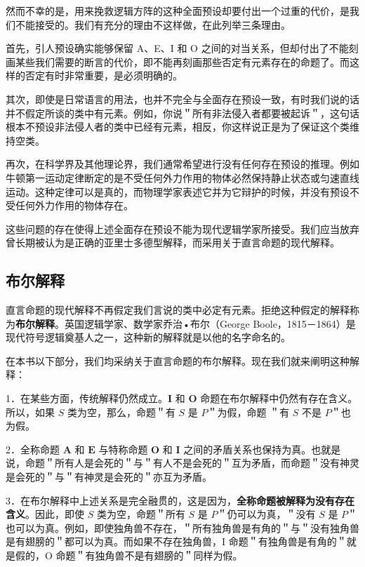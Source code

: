 \begin{logicbox}[title=章节导读]
然而不幸的是，用来挽救逻辑方阵的这种全面预设却要付出一个过重的代价，是我们不能接受的。我们有充分的理由不这样做，在此列举三条理由。

首先，引人预设确实能够保留 A、E、I 和 O 之间的对当关系，但却付出了不能刻画某些我们需要的断言的代价，即不能再刻画那些否定有元素存在的命题了。而这样的否定有时非常重要，是必须明确的。

其次，即使是日常语言的用法，也并不完全与全面存在预设一致，有时我们说的话并不假定所谈的类中有元素。例如，你说＂所有非法侵入者都要被起诉＂，这句话根本不预设非法侵人者的类中已经有元素，相反，你这样说正是为了保证这个类维持空类。

再次，在科学界及其他理论界，我们通常希望进行没有任何存在预设的推理。例如牛顿第一运动定律断定的是不受任何外力作用的物体必然保持静止状态或匀速直线运动。这种定律可以是真的，而物理学家表述它并为它辩护的时候，并没有预设不受任何外力作用的物体存在。

这些问题的存在使得上述全面存在预设不能为现代逻辑学家所接受。我们应当放弃曾长期被认为是正确的亚里士多德型解释，而采用关于直言命题的现代解释。

\subsection{布尔解释}

直言命题的现代解释不再假定我们言说的类中必定有元素。拒绝这种假定的解释称为\textbf{布尔解释}。英国逻辑学家、数学家乔治•布尔（George Boole，1815－1864）是现代符号逻辑奠基人之一，这种新的解释就是以他的名字命名的。\cite{boole1854}

在本书以下部分，我们均采纳关于直言命题的布尔解释。现在我们就来阐明这种解释：

1．在某些方面，传统解释仍然成立。$\mathbf{I}$ 和 $\mathbf{O}$ 命题在布尔解释中仍然有存在含义。所以，如果 $S$ 类为空，那么，命题＂有 $S$ 是 $P$＂为假，命题 ＂有 $S$ 不是 $P$＂也为假。

2．全称命题 $\mathbf{A}$ 和 $\mathbf{E}$ 与特称命题 $\mathbf{O}$ 和 $\mathbf{I}$ 之间的矛盾关系也保持为真。也就是说，命题＂所有人是会死的＂与＂有人不是会死的＂互为矛盾，而命题＂没有神灵是会死的＂与＂有神灵是会死的＂亦互为矛盾。

3．在布尔解释中上述关系是完全融贯的，这是因为，\textbf{全称命题被解释为没有存在含义}。因此，即使 $S$ 类为空，命题＂所有 $S$ 是 $P$＂仍可以为真，＂没有 $S$ 是 $P$＂也可以为真。例如，即使独角兽不存在，＂所有独角兽是有角的＂与＂没有独角兽是有翅膀的＂都可以为真。而如果不存在独角兽，I 命题＂有独角兽是有角的＂就是假的，O 命题＂有独角兽不是有翅膀的＂同样为假。


\end{logicbox}
